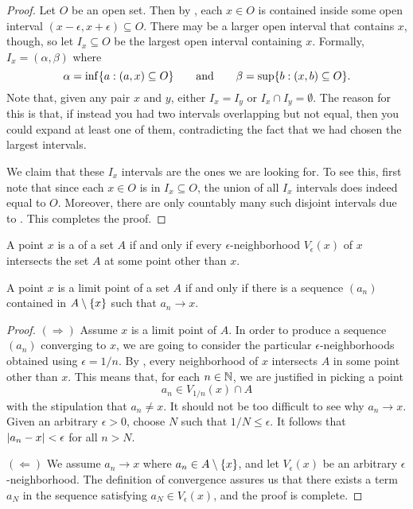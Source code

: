 \begin{proof}
  Let $O$ be an open set. Then by , each $x \in
  O$ is contained inside some open interval $(x - \epsilon, x +
  \epsilon) \subseteq O$. There may be a larger open interval that
  contains $x$, though, so let $I_x \subseteq O$ be the largest open
  interval containing $x$. Formally, $I_x = (\alpha, \beta)$ where
  \[ \alpha = \inf\{ a : (a, x) \subseteq O \} \qquad \text{and} \qquad
  \beta = \sup\{ b : (x, b) \subseteq O \}. \]
  Note that, given any pair $x$ and $y$, either $I_x = I_y$ or $I_x
  \cap I_y = \emptyset$. The reason for this is that, if instead you
  had two intervals overlapping but not equal, then you could expand
  at least one of them, contradicting the fact that we had chosen the
  largest intervals.

  We claim that these $I_x$ intervals are the ones we are looking
  for. To see this, first note that since each $x \in O$ is in $I_x
  \subseteq O$, the union of all $I_x$ intervals does indeed equal to
  $O$. Moreover, there are only countably many such disjoint
  intervals due to . This completes the proof.
\end{proof}

\begin{definition}
  A point $x$ is a  of a set $A$ if and only if
  every $\epsilon$-neighborhood $V_\epsilon(x)$ of $x$ intersects the
  set $A$ at some point other than $x$.
\end{definition}

\begin{theorem}
  A point $x$ is a limit point of a set $A$ if and only if there is a
  sequence $(a_n)$ contained in $A \setminus \{ x \}$ such that $a_n \to x$.
\end{theorem}

\begin{proof}
  \phantom{.}

  $(\Rightarrow)$ Assume $x$ is a limit point of $A$. In order to
  produce a sequence
  $(a_n)$ converging to $x$, we are going to consider the particular
  $\epsilon$-neighborhoods
  obtained using $\epsilon = 1/n$. By , every
  neighborhood of $x$ intersects
  $A$ in some point other than $x$. This means that, for each $n \in
  \mathbb N$, we are justified
  in picking a point
  \[ a_n \in V_{1/n}(x) \cap A \]
  with the stipulation that $a_n \neq x$. It should not be too
  difficult to see why $a_n \to x$. Given an arbitrary $\epsilon >
  0$, choose $N$ such that $1/N \leq \epsilon$. It follows that
  $| a_n - x | < \epsilon$ for all $n > N$.

  $(\Leftarrow)$ We assume $a_n \to x$ where $a_n \in A
  \setminus \{ x \}$, and let $V_\epsilon(x)$ be an arbitrary
  $\epsilon$-neighborhood. The definition of convergence assures us
  that there exists a term $a_N$ in the sequence satisfying $a_N \in
  V_\epsilon(x)$, and the proof is complete.
\end{proof}

